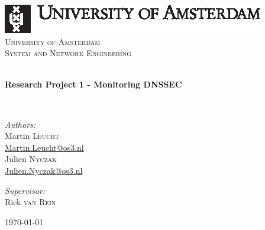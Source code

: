 \begin{titlepage}
\begin{center}

\includegraphics{Images/uva.eps}~
\\[1cm]
\textsc{\LARGE University of Amsterdam}\\
\textsc{\Large System and Network Engineering}

\HRule \\[0.4cm]{ \huge \bfseries Research Project 1 - Monitoring DNSSEC \\[0.4cm]}

\HRule \\[1.5cm]

\noindent
\begin{minipage}
{0.3\textwidth}
\begin{flushleft} \large \emph{Authors:}\\
Martin \textsc{Leucht}\\
\href{mailto:martin.leucht@os3.nl}{Martin.Leucht@os3.nl}\\[2ex]
Julien \textsc{Nyczak}\\
\href{mailto:julien.nyczak@os3.nl}{Julien.Nyczak@os3.nl}\\[2ex]
\end{flushleft}
\end{minipage}
\begin{minipage}
{0.3\textwidth}
\begin{flushright} \large \emph{Supervisor:}\\
Rick \textsc{van Rein}\\
\end{flushright}
\end{minipage}

\vfill

{\large \today}

\end{center}
\end{titlepage}

